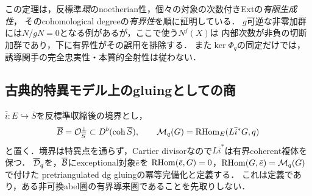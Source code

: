 \begin{remark}[三つの有限性の区別]\label{rem:three-finiteness}
この定理は，反標準\emph{環}のnoetherian性，個々の対象の次数付きExtの\emph{有限生成性}，
そのcohomological degreeの\emph{有界性}を順に証明している．
$g$可逆な非零加群には$N/gN=0$となる例があるが，ここで使う$N^j(X)$は
内部次数が非負の切断加群であり，下に有界性がその誤用を排除する．
また$\ker\Phi_q$の同定だけでは，誘導関手の完全忠実性・本質的全射性は従わない．
\end{remark}

\subsection{古典的特異モデル上のgluingとしての商}
$\bar i:E\hookrightarrow\overline S$を反標準収縮後の境界とし，
\[
 \overline{\mathcal B}=\mathcal O_{\overline S}^{\perp}\subset D^b(\operatorname{coh}\overline S),\qquad
 \mathcal M_q(G)=\operatorname{RHom}_E(L\bar i^*G,q)
\]
と置く．境界は特異点を通らず，Cartier divisorなので$L\bar i^*$は有界coherent複体を保つ．
$\overline{\mathcal D}_q$を，$\overline{\mathcal B}$にexceptional対象$\bar e$を
$\operatorname{RHom}(\bar e,G)=0$，$\operatorname{RHom}(G,\bar e)=\mathcal M_q(G)$で付けた
pretriangulated dg gluingの冪等完備化と定義する．
これは定義であり，ある非可換abel圏の有界導来圏であることを先取りしない．


